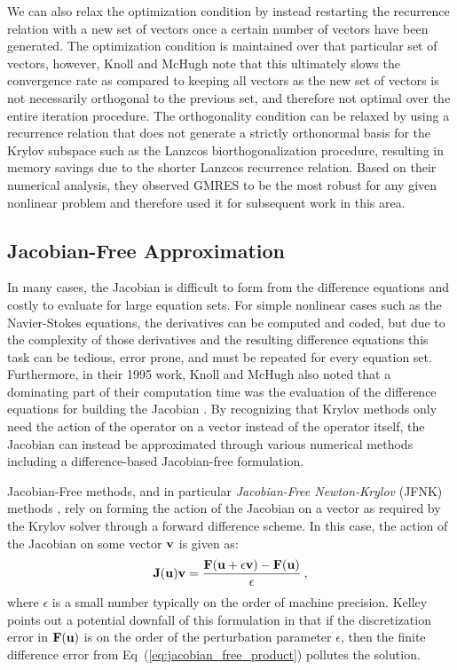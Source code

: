 We can also relax the optimization condition by instead restarting the
recurrence relation with a new set of vectors once a certain number of
vectors have been generated. The optimization condition is maintained
over that particular set of vectors, however, Knoll and McHugh note
that this ultimately slows the convergence rate as compared to keeping
all vectors as the new set of vectors is not necessarily orthogonal to
the previous set, and therefore not optimal over the entire iteration
procedure. The orthogonality condition can be relaxed by using a
recurrence relation that does not generate a strictly orthonormal
basis for the Krylov subspace such as the Lanzcos biorthogonalization
procedure, resulting in memory savings due to the shorter Lanzcos
recurrence relation. Based on their numerical analysis, they observed
GMRES to be the most robust for any given nonlinear problem and
therefore used it for subsequent work in this area.

\subsection{Jacobian-Free Approximation}
\label{subsec:jacobian_free_approximation}
In many cases, the Jacobian is difficult to form from the difference
equations and costly to evaluate for large equation sets. For simple
nonlinear cases such as the Navier-Stokes equations, the derivatives
can be computed and coded, but due to the complexity of those
derivatives and the resulting difference equations this task can be
tedious, error prone, and must be repeated for every equation
set. Furthermore, in their 1995 work, Knoll and McHugh also noted that
a dominating part of their computation time was the evaluation of the
difference equations for building the Jacobian
\citep{knoll_newton-krylov_1995}. By recognizing that Krylov methods
only need the action of the operator on a vector instead of the
operator itself, the Jacobian can instead be approximated through
various numerical methods including a difference-based Jacobian-free
formulation.

Jacobian-Free methods, and in particular \textit{Jacobian-Free
  Newton-Krylov} (JFNK) methods \citep{knoll_jacobian-free_2004}, rely
on forming the action of the Jacobian on a vector as required by the
Krylov solver through a forward difference scheme. In this case, the
action of the Jacobian on some vector $\mathbf{v}$ is given as:
\begin{equation}
  \mathbf{J}(\mathbf{u})\mathbf{v} = \frac{\mathbf{F}(\mathbf{u} + \epsilon \mathbf{v}) -
    \mathbf{F}(\mathbf{u})}{\epsilon}\:,
  \label{eq:jacobian_free_product}
\end{equation}
where $\epsilon$ is a small number typically on the order of machine
precision. Kelley \citep{kelley_iterative_1995} points out a potential
downfall of this formulation in that if the discretization error in
$\mathbf{F}(\mathbf{u})$ is on the order of the perturbation parameter
$\epsilon$, then the finite difference error from
Eq~(\ref{eq:jacobian_free_product}) pollutes the solution. 

